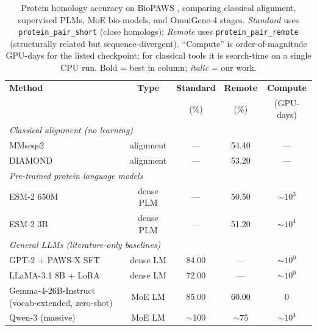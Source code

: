 \begin{table}[t]
\centering
\small
\caption{Protein homology accuracy on BioPAWS \citep{wang2026biopaws}, comparing
classical alignment, supervised PLMs, MoE bio-models, and OmniGene-4 stages.
\textit{Standard} uses \texttt{protein\_pair\_short} (close homologs); \textit{Remote}
uses \texttt{protein\_pair\_remote} (structurally related but sequence-divergent).
``Compute'' is order-of-magnitude GPU-days for the listed checkpoint; for
classical tools it is search-time on a single CPU run. Bold = best in column;
\textit{italic} = our work.}
\label{tab:t1-homology}
\begin{tabular}{l c c c c}
\toprule
\textbf{Method} & \textbf{Type} & \textbf{Standard} & \textbf{Remote} & \textbf{Compute} \\
                &               & (\%)              & (\%)            & (GPU-days)       \\
\midrule
\multicolumn{5}{l}{\textit{Classical alignment (no learning)}} \\
\quad MMseqs2 \citep{steinegger2017mmseqs2}     & alignment & ---     & 54.40   & --- \\
\quad DIAMOND  \citep{buchfink2021diamond}      & alignment & ---     & 53.20   & --- \\
\midrule
\multicolumn{5}{l}{\textit{Pre-trained protein language models}} \\
\quad ESM-2 650M \citep{lin2023evolutionary}    & dense PLM & ---     & 50.50   & $\sim 10^3$ \\
\quad ESM-2 3B   \citep{lin2023evolutionary}    & dense PLM & ---     & 51.20   & $\sim 10^4$ \\
\midrule
\multicolumn{5}{l}{\textit{General LLMs (literature-only baselines)}} \\
\quad GPT-2 + PAWS-X SFT \citep{wang2026biopaws}            & dense LM  & 84.00   & ---     & $\sim 10^{0}$ \\
\quad LLaMA-3.1 8B + LoRA \citep{wang2026biopaws}           & dense LM  & 72.00   & ---     & $\sim 10^{0}$ \\
\quad Gemma-4-26B-Instruct (vocab-extended, zero-shot)      & MoE LM    & 85.00   & 60.00   & 0 \\
\quad Qwen-3 (massive)                                       & MoE LM    & $\sim$100 & $\sim$75 & $\sim 10^{4}$ \\

\end{tabular}
\end{table}
